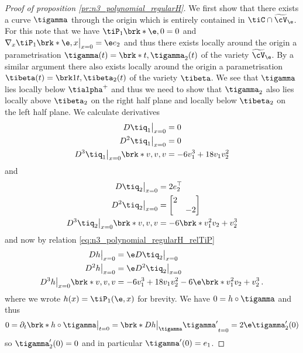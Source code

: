 \begin{proof}[Proof of proposition \ref{pr:n3_polynomial_regularH}]
  We first show that there exists a curve $\tigamma$ through the origin which is
  entirely contained in $\tiC\cap \widetilde{\cV}_\e$.
  For this note that we have $\tiP_1\brk*{\e,0}=0$ and $\nabla_x\tiP_1\brk*{\e,x}\big\vert_{x=0}=\e e_2$
  and thus there exists locally around the origin a parametrisation $\tigamma(t)=\brk*{t,\tigamma_2(t)}$
  of the variety $\widetilde{\cV}_\e$.
  By a similar argument there also exists locally around the origin  a parametrisation $\tibeta(t)=\brk1{t,\tibeta_2(t)}$ of the variety $\tibeta$.
  We see that $\tigamma$ lies locally below $\tialpha^+$ and thus we need to show that $\tigamma_2$ also lies locally
  above $\tibeta_2$ on the right half plane and locally below $\tibeta_2$ on the left half plane.
  We calculate derivatives
  \begin{align*}
    D\tiq_1\big\vert_{x=0}&=0 \\
    D^2\tiq_1\big\vert_{x=0}&=0 \\
    D^3\tiq_1\big\vert_{x=0}\brk*{v,v,v}&=-6v_1^3+18v_1v_2^2
  \end{align*}
  and
  \begin{align*}
    D\tiq_2\big\vert_{x=0}&=2e_2^\top\\
    D^2\tiq_2\big\vert_{x=0}&=\begin{bmatrix}
      2&\\
      &-2
    \end{bmatrix} \\
	    D^3\tiq_2\big\vert_{x=0}\brk*{v,v,v}&=-6\brk*{v_1^2v_2+v_2^3}
  \end{align*}
  and now by relation \eqref{eq:n3_polynomial_regularH_relTiP}
  \begin{align}
    \begin{aligned}
	    Dh\big\vert_{x=0}&=\e D\tiq_2\big\vert_{x=0}\\
	    D^2h\big\vert_{x=0}&=\e D^2\tiq_2\big\vert_{x=0} \\
    D^3h\big\vert_{x=0}\brk*{v,v,v}&=-6v_1^3+18v_1v_2^2-6\e\brk*{v_1^2v_2+v_2^3}
    \,.
    \end{aligned}
    \label{eq:n3_polynomial_regularH_DPDq}
  \end{align}
  where we wrote $h(x)=\tiP_1(\e,x)$ for brevity. We have $0=h\circ\tigamma$ and thus
  \begin{align}
    0=\partial_t\brk*{h\circ\tigamma}\big\vert_{t=0}=\brk*{Dh\big\vert_{\tigamma}\tigamma'}_{t=0}
    =2\e\tigamma_2'(0)\label{eq:n3_polynomial_regularH_gammaDer1}
  \end{align}
  so $\tigamma_2'(0)=0$ and in particular $\tigamma'(0)=e_1$.

\end{proof}
